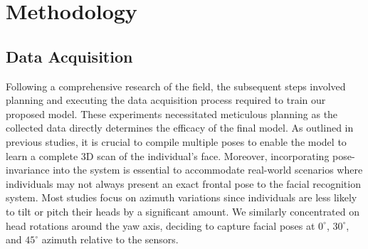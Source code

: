 \documentclass{mpaper}
\begin{document}
\section{Methodology}
\subsection{Data Acquisition}
Following a comprehensive research of the field, the subsequent steps involved planning and executing the data acquisition process required to train our proposed model. These experiments necessitated meticulous planning as the collected data directly determines the efficacy of the final model. As outlined in previous studies, it is crucial to compile multiple poses to enable the model to learn a complete 3D scan of the individual's face. Moreover, incorporating pose-invariance into the system is essential to accommodate real-world scenarios where individuals may not always present an exact frontal pose to the facial recognition system. Most studies focus on azimuth variations since individuals are less likely to tilt or pitch their heads by a significant amount. We similarly concentrated on head rotations around the yaw axis, deciding to capture facial poses at $0^\circ$, $30^\circ$, and $45^\circ$ azimuth relative to the sensors.
\end{document}

